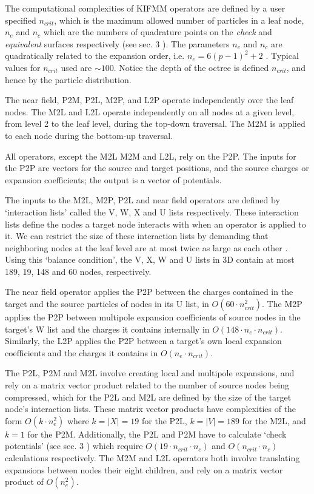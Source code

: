 \documentclass{IEEEcsmag}
\begin{document}
The computational complexities of KIFMM operators are defined by a user specified $n_{crit}$, which is the maximum allowed number of particles in a leaf node, $n_e$ and $n_c$ which are the numbers of quadrature points on the \textit{check} and \textit{equivalent} surfaces respectively (see sec. 3 \cite{Ying2004}). The parameters $n_e$ and $n_c$ are quadratically related to the expansion order, i.e. $n_e = 6(p-1)^2 + 2$ \cite{Ying2004}. Typical values for $n_{crit}$ used are $\sim 100$. Notice the depth of the octree is defined $n_{crit}$, and hence by the particle distribution.

The near field, P2M, P2L, M2P, and L2P operate independently over the leaf nodes. The M2L and L2L operate independently on all nodes at a given level, from level 2 to the leaf level, during the top-down traversal. The M2M is applied to each node during the bottom-up traversal.

All operators, except the M2L M2M and L2L, rely on the P2P. The inputs for the P2P are vectors for the source and target positions, and the source charges or expansion coefficients; the output is a vector of potentials.

The inputs to the M2L, M2P, P2L and near field operators are defined by `interaction lists' called the V, W, X and U lists respectively. These interaction lists define the nodes a target node interacts with when an operator is applied to it. We can restrict the size of these interaction lists by demanding that neighboring nodes at the leaf level are at most twice as large as each other \cite{Sundar2007}. Using this `balance condition', the V, X, W and U lists in 3D contain at most 189, 19, 148 and 60 nodes, respectively.

The near field operator applies the P2P between the charges contained in the target and the source particles of nodes in its U list, in $O(60 \cdot n_{crit}^2)$. The M2P applies the P2P between multipole expansion coefficients of source nodes in the target's W list and the charges it contains internally in $O(148 \cdot n_e \cdot n_{crit})$. Similarly, the L2P applies the P2P between a target's own local expansion coefficients and the charges it contains in $O(n_e \cdot n_{crit})$.

The P2L, P2M and M2L involve creating local and multipole expansions, and rely on a matrix vector product related to the number of source nodes being compressed, which for the P2L and M2L are defined by the size of the target node's interaction lists. These matrix vector products have complexities of the form $O(k \cdot n_e^2)$ where $k = |X| = 19$ for the P2L, $k = |V| = 189$ for the M2L, and $k = 1$ for the P2M. Additionally, the P2L and P2M have to calculate `check potentials' (see sec. 3 \cite{Ying2004}) which require $O(19 \cdot n_{crit} \cdot n_c)$ and $O(n_{crit} \cdot n_c)$ calculations respectively. The M2M and L2L operators both involve translating expansions between nodes their eight children, and rely on a matrix vector product of $O(n_e^2)$.
\end{document}
